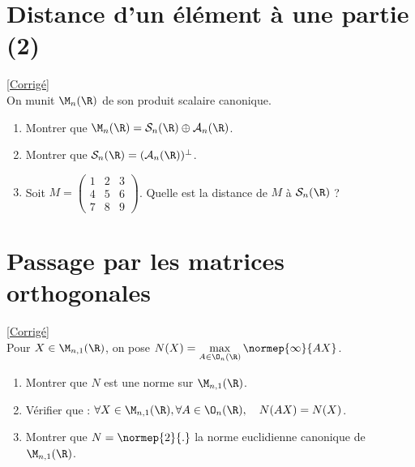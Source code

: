 \documentclass{book}
\begin{document}
	\section{Distance d'un élément à une partie (2)}
	\textcolor{blue}{\hyperref[sec:distance-dun-element-a-une-partie-2]{[Corrigé]}}\\
	\label{Distance d'un élément à une partie 2}
	On munit $\M_n(\R)$ de son produit scalaire canonique.
	\begin{enumerate}
		\item Montrer que $\M_n(\R)=\mathcal S_n(\R)\oplus\mathcal A_n(\R)$.
		\item Montrer que $\mathcal S_n(\R)=(\mathcal A_n(\R))^\perp$.
		\item Soit $M=\begin{pmatrix}
			1&2&3\\4&5&6\\7&8&9
		\end{pmatrix}$. Quelle est la distance de $M$ à $\mathcal S_n(\R)$ ?
	\end{enumerate}
	
	\section{Passage par les matrices orthogonales}
	\textcolor{blue}{\hyperref[sec:passage-par-les-matrices-orthogonales]{[Corrigé]}}\\
	\label{Passage par les matrices orthogonales}
	Pour $X\in\M_{n,1}(\R)$, on pose $\displaystyle N(X)=\max_{A\in\O_n(\R)}\normep{\infty}{AX}$.
	\begin{enumerate}
		\item Montrer que $N$ est une norme sur $\M_{n,1}(\R)$.
		\item Vérifier que : $\forall X\in \M_{n,1}(\R),\forall A \in \O_n(\R),\quad N(AX)=N(X)$.
		\item Montrer que $N=\normep{2}{.}$ la norme euclidienne canonique de $\M_{n,1}(\R)$.
	\end{enumerate}
	
\end{document}
